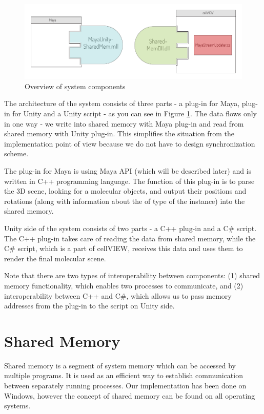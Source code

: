 \documentclass[
  digital, %
  table,   %
  nolof,     %
  nolot,     %
]{fithesis3}
\begin{document}
\begin{figure}
  \begin{center}
    \includegraphics[scale=0.8]{images/system-architecture-overview.pdf}
  \end{center}
  \caption{Overview of system components}
  \label{fig:system-overview}
\end{figure}

The architecture of the system consists of three parts - a plug-in for Maya, plug-in for Unity and a Unity script - as you can see in Figure \ref{fig:system-overview}.
The data flows only in one way - we write into shared memory with Maya plug-in and read from shared memory with Unity plug-in. This simplifies the situation from the implementation point of view because we do not have to design synchronization scheme.

The plug-in for Maya is using Maya API (which will be described later) and is written in C++ programming language. The function of this plug-in is to parse the 3D scene, looking for a molecular objects, and output their positions and rotations (along with information about the of type of the instance) into the shared memory.

Unity side of the system consists of two parts - a C++ plug-in and a C\# script. The C++ plug-in takes care of reading the data from shared memory, while the C\# script, which is a part of cellVIEW, receives this data and uses them to render the final molecular scene.

Note that there are two types of interoperability between components: (1) shared memory functionality, which enables two processes to communicate, and (2) interoperability between C++ and C\#, which allows us to pass memory addresses from the plug-in to the script on Unity side.

\section{Shared Memory}
Shared memory is a segment of system memory which can be accessed by multiple programs. It is used as an efficient way to establish communication between separately running processes. Our implementation has been done on Windows, however the concept of shared memory can be found on all operating systems.
\end{document}
